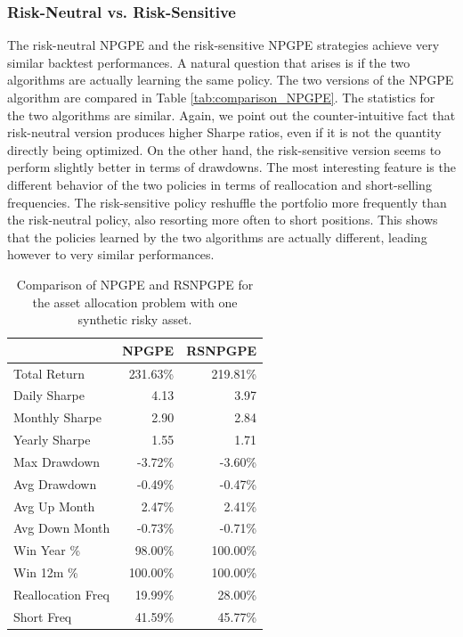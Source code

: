 \subsubsection{Risk-Neutral vs. Risk-Sensitive}
The risk-neutral \gls{NPGPE} and the risk-sensitive \gls{NPGPE} strategies achieve very similar backtest performances. A natural question that arises is if the two algorithms are actually learning the same policy. The two versions of the \gls{NPGPE} algorithm are compared in Table \ref{tab:comparison_NPGPE}. The statistics for the two algorithms are similar. Again, we point out the counter-intuitive fact that risk-neutral version produces higher Sharpe ratios, even if it is not the quantity directly being optimized. On the other hand, the risk-sensitive version seems to perform slightly better in terms of drawdowns. The most interesting feature is the different behavior of the two policies in terms of reallocation and short-selling frequencies. The risk-sensitive policy reshuffle the portfolio more frequently than the risk-neutral policy, also resorting more often to short positions. This shows that the policies learned by the two algorithms are actually different, leading however to very similar performances. 

\begin{table}[t!]
\centering
\begin{tabular}{@{}lrr@{}}
\toprule
                  & NPGPE   & RSNPGPE  \\ \midrule
Total Return      & 231.63\%  & 219.81\% \\
Daily Sharpe      & 4.13     & 3.97     \\
Monthly Sharpe    & 2.90     & 2.84     \\
Yearly Sharpe     & 1.55     & 1.71     \\
Max Drawdown      & -3.72\% & -3.60\%  \\
Avg Drawdown      & -0.49\%  & -0.47\%  \\
Avg Up Month      & 2.47\%   & 2.41\%   \\
Avg Down Month    & -0.73\%  & -0.71\%  \\
Win Year \%       & 98.00\%  & 100.00\% \\
Win 12m \%        & 100.00\%  & 100.00\% \\
Reallocation Freq & 19.99\%  & 28.00\%  \\
Short Freq        & 41.59\%  & 45.77\%  \\ \bottomrule
\end{tabular}
\caption{Comparison of NPGPE and RSNPGPE for the asset allocation problem with one synthetic risky asset.}
\label{tab:omparison_NPGPE}
\end{table}


